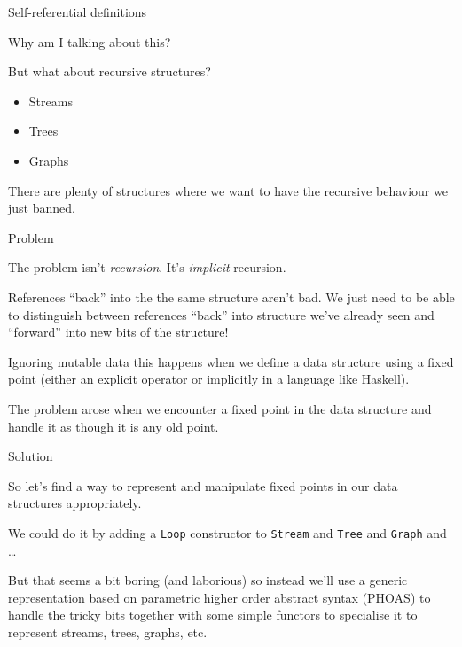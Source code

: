 \documentclass[ignorenonframetext]{beamer}
\providecommand{\tightlist}{%
  \setlength{\itemsep}{0pt}\setlength{\parskip}{0pt}}
\begin{document}
\begin{frame}{Self-referential definitions}
\begin{frame}{%
\protect\hypertarget{why-am-i-talking-about-this}{%
Why am I talking about this?}}
\end{frame}

\begin{frame}

But what about recursive structures?

\begin{itemize}
\tightlist
\item
  Streams
\item
  Trees
\item
  Graphs
\end{itemize}

There are plenty of structures where we want to have the recursive
behaviour we just banned.

\end{frame}

\begin{frame}{%
\protect\hypertarget{problem}{%
Problem}}

The problem isn’t \emph{recursion}. It’s \emph{implicit} recursion.

References “back” into the the same structure aren’t bad. We just need
to be able to distinguish between references “back” into structure we’ve
already seen and “forward” into new bits of the structure!

Ignoring mutable data this happens when we define a data structure using
a fixed point (either an explicit operator or implicitly in a language
like Haskell).

The problem arose when we encounter a fixed point in the data structure
and handle it as though it is any old point.

\end{frame}

\begin{frame}[fragile]{%
\protect\hypertarget{solution}{%
Solution}}

So let’s find a way to represent and manipulate fixed points in our data
structures appropriately.

We could do it by adding a \texttt{Loop} constructor to \texttt{Stream}
and \texttt{Tree} and \texttt{Graph} and \ldots{}

But that seems a bit boring (and laborious) so instead we’ll use a
generic representation based on parametric higher order abstract syntax
(PHOAS) to handle the tricky bits together with some simple functors to
specialise it to represent streams, trees, graphs, etc.

\end{frame}


\end{frame}
\end{document}
